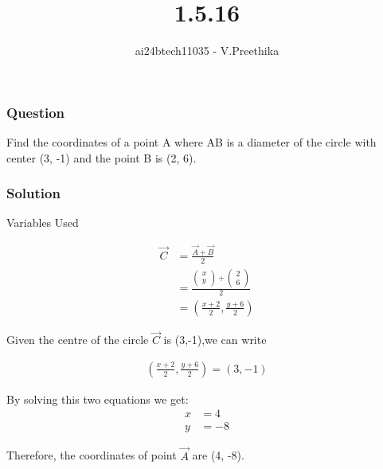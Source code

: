 \documentclass{beamer}
\newcommand{\createMat}[2]{\begin{pmatrix} #1 \\ #2 \end{pmatrix}}
\begin{document}
\title{1.5.16}
\author{ai24btech11035 - V.Preethika}
\date{}
\frame{\titlepage}

\begin{frame}
\frametitle{Question}
Find the coordinates of a point A where AB is a diameter of the circle with center (3, -1) and the point B is (2, 6).\\
\end{frame}

\begin{frame}[allowframebreaks]
\frametitle{Solution}
\begin{table}[htbp]
\centering
  
	\caption{Variables Used}
	\label{tab1.5.16}
\end{table}
	\begin{align}
    \vec{C} &= \frac{\vec{A}+\vec{B}}{2} \\
		&= \frac{\createMat{x}{y} + \createMat{2}{6}}{2} \\
             &= \left(\frac{x+2}{2}, \frac{y+6}{2}\right)
	\end{align}
	  
    
		Given the centre of the circle $\vec{C}$ is (3,-1),we can write
    
		\begin{align}
    \left( \frac{x + 2}{2}, \frac{y + 6}{2} \right) = (3, -1)
		\end{align}
    
    By solving this two equations we get:
    \begin{align}
	    x &= 4 \\
	    y &= -8
    \end{align}

    
    Therefore, the coordinates of point $\vec{A}$ are (4, -8).
\end{frame}
\end{document}
